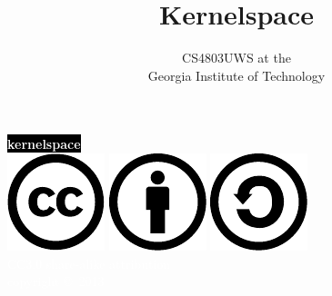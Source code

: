 \documentclass[mathserif,xcolor={dvipsnames,table}]{beamer}
\title{\textbf{Kernelspace}}
\date{}
\author{CS4803UWS at the\\
Georgia Institute of Technology
}
\begin{document}
{
%
\begin{frame}[plain]
\textcolor{white}{
%
\colorbox{black}{\textbf{kernelspace}}
}
\vspace{2.7in}
\\
\hfill\includegraphics[scale=.25]{images/cc-logo.pdf}
\includegraphics[scale=.25]{images/cc-new.pdf}
\includegraphics[scale=.25]{images/cc-share.pdf}
\textcolor{white}{
\\
\hfill \tiny{CC3.0 share-alike attribution}\\
}
\textcolor{white}{
\hfill \scriptsize{copyright \copyright\ 2013}\\
}
\end{frame}
}
\end{document}
